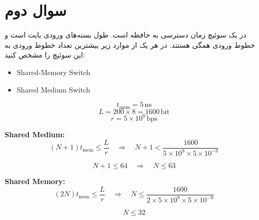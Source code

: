 \section{سوال دوم}

در یک سوئیچ  زمان دسترسی به حافظه  است. طول بسته‌های ورودی  بایت است و خطوط ورودی همگی  هستند. در هر یک از موارد زیر بیشترین تعداد خطوط ورودی به این سوئیچ را مشخص کنید:

\begin{latin}
	\begin{itemize}
		\item Shared-Memory Switch
		\item Shared Medium Switch
	\end{itemize}
\end{latin}


\begin{qsolve}
	\begin{latin}
		\[
		t_{\text{mem}} = 5 \, \text{ns}
		\]
		\[
		L = 200 \times 8 = 1600 \, \text{bit}
		\]
		\[
		r = 5 \times 10^9 \, \text{bps}
		\]
		
		\textbf{Shared Medium:}
		\[
		(N + 1)t_{\text{mem}} \leq \frac{L}{r} \quad \Rightarrow \quad N + 1 < \frac{1600}{5 \times 10^9 \times 5 \times 10^{-9}}
		\]
		
		\[
		N + 1 \leq 64 \quad \Rightarrow \quad N \leq 63
		\]
		
		\textbf{Shared Memory:}
		\[
		(2N)t_{\text{mem}} \leq \frac{L}{r} \quad \Rightarrow \quad N \leq \frac{1600}{2 \times 5 \times 10^9 \times 5 \times 10^{-9}}
		\]
		
		\[
		N \leq 32
		\]
	\end{latin}
\end{qsolve}